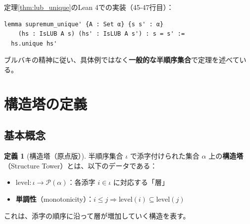\documentclass[a4paper,12pt]{ltjsarticle}
\theoremstyle{definition}
\newtheorem{definition}[theorem]{定義}
\begin{document}
\begin{center}
\end{center}

\begin{bourbaki}[Leanコードでの実装]
定理\ref{thm:lub_unique}のLean 4での実装（45-47行目）：
\begin{verbatim}
lemma supremum_unique' {A : Set α} {s s' : α}
    (hs : IsLUB A s) (hs' : IsLUB A s') : s = s' :=
  hs.unique hs'
\end{verbatim}

ブルバキの精神に従い、具体例ではなく\textbf{一般的な半順序集合}で定理を述べている。
\end{bourbaki}

\section{構造塔の定義}

\subsection{基本概念}

\begin{definition}[構造塔（原点版）]\label{def:structure_tower_origin}
半順序集合 $\iota$ で添字付けられた集合 $\alpha$ 上の\textbf{構造塔}（Structure Tower）とは、以下のデータである：

\begin{itemize}
\item $\mathrm{level} : \iota \to \mathcal{P}(\alpha)$：各添字 $i \in \iota$ に対応する「層」
\item \textbf{単調性}（monotonicity）：$i \leq j \Rightarrow \mathrm{level}(i) \subseteq \mathrm{level}(j)$
\end{itemize}

これは、添字の順序に沿って層が増加していく構造を表す。
\end{definition}
\end{document}
